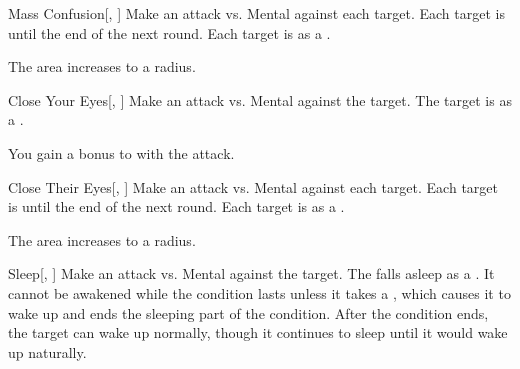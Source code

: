 \lowercase{\hypertarget{spell:Mass Confusion}{}}\label{spell:Mass Confusion}
\begin{freeability}[Rank 5]{\hypertarget{spell:Mass Confusion}{Mass Confusion}}[, ]
Make an attack vs. Mental against each target.
\hit Each target is \confused until the end of the next round.
\crit Each target is  as a .

\rankline
{} The area increases to a \areamed radius.
\end{freeability}
\vspace{0.25em}



\lowercase{\hypertarget{spell:Close Your Eyes}{}}\label{spell:Close Your Eyes}
\begin{freeability}[Rank 6]{\hypertarget{spell:Close Your Eyes}{Close Your Eyes}}[, ]
Make an attack vs. Mental against the target.
\hit The target is  as a .

\rankline
{} You gain a  bonus to  with the attack.
\end{freeability}
\vspace{0.25em}



\lowercase{\hypertarget{spell:Close Their Eyes}{}}\label{spell:Close Their Eyes}
\begin{freeability}[Rank 7]{\hypertarget{spell:Close Their Eyes}{Close Their Eyes}}[, ]
Make an attack vs. Mental against each target.
\hit Each target is \blinded until the end of the next round.
\crit Each target is  as a .

\rankline
{} The area increases to a \areamed radius.
\end{freeability}
\vspace{0.25em}



\lowercase{\hypertarget{spell:Sleep}{}}\label{spell:Sleep}
\begin{freeability}[Rank 8]{\hypertarget{spell:Sleep}{Sleep}}[, ]
Make an attack vs. Mental against the target.
\hit The falls asleep as a .
It cannot be awakened while the condition lasts unless it takes a , which causes it to wake up and ends the sleeping part of the condition.
After the condition ends, the target can wake up normally, though it continues to sleep until it would wake up naturally.
\end{freeability}
\vspace{0.25em}



